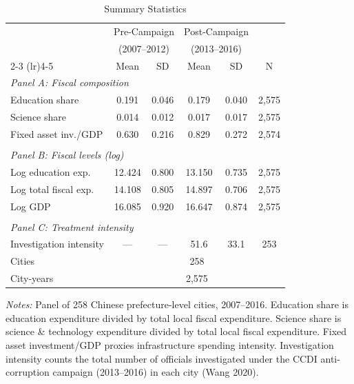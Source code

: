 \begin{table}[t]
\centering
\caption{Summary Statistics}
\label{tab:sumstats}
\small
\begin{tabular}{lccccc}
\hline\hline
    & \multicolumn{2}{c}{Pre-Campaign} & \multicolumn{2}{c}{Post-Campaign} & \\
    & \multicolumn{2}{c}{(2007--2012)} & \multicolumn{2}{c}{(2013--2016)} & \\
    \cmidrule(lr){2-3} \cmidrule(lr){4-5}
    & Mean & SD & Mean & SD & N \\
\hline
    \multicolumn{6}{l}{\textit{Panel A: Fiscal composition}} \\[3pt]
    Education share & 0.191 & 0.046 & 0.179 & 0.040 & 2,575 \\
    Science share & 0.014 & 0.012 & 0.017 & 0.017 & 2,575 \\
    Fixed asset inv./GDP & 0.630 & 0.216 & 0.829 & 0.272 & 2,574 \\
    \\
    \multicolumn{6}{l}{\textit{Panel B: Fiscal levels (log)}} \\[3pt]
    Log education exp. & 12.424 & 0.800 & 13.150 & 0.735 & 2,575 \\
    Log total fiscal exp. & 14.108 & 0.805 & 14.897 & 0.706 & 2,575 \\
    Log GDP & 16.085 & 0.920 & 16.647 & 0.874 & 2,575 \\
    \\
    \multicolumn{6}{l}{\textit{Panel C: Treatment intensity}} \\[3pt]
    Investigation intensity & --- & --- & 51.6 & 33.1 & 253 \\
\hline
    Cities & \multicolumn{5}{c}{258} \\
    City-years & \multicolumn{5}{c}{2,575} \\
\hline\hline
\end{tabular}
\begin{tablenotes}
\item \textit{Notes:} Panel of 258 Chinese prefecture-level cities, 2007--2016.
Education share is education expenditure divided by total local fiscal expenditure.
Science share is science \& technology expenditure divided by total local fiscal expenditure.
Fixed asset investment/GDP proxies infrastructure spending intensity.
Investigation intensity counts the total number of officials investigated under the
CCDI anti-corruption campaign (2013--2016) in each city (Wang 2020).
\end{tablenotes}
\end{table}
